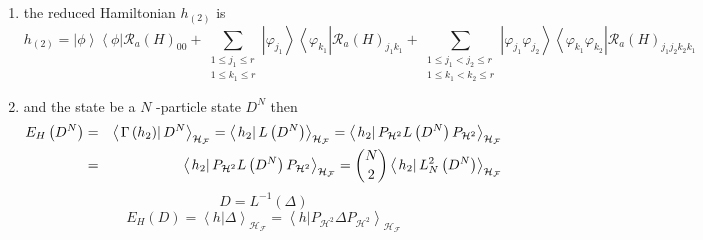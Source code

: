 \documentclass[aps,preprint]{revtex4}
\begin{document}
\begin{enumerate}
\item the reduced Hamiltonian $h_{\left( 2\right) }$ is 
\begin{equation}
h_{\left( 2\right) }=\left\vert \phi \right\rangle \left\langle \phi
\right\vert \mathcal{R}_{a}\left( H\right) _{00}+\sum_{\substack{ 1\leq
j_{1}\leq r  \\ 1\leq k_{1}\leq r}}\left\vert \varphi _{j_{1}}\right\rangle
\left\langle \varphi _{k_{1}}\right\vert \mathcal{R}_{a}\left( H\right)
_{j_{1}k_{1}}+\sum_{\substack{ 1\leq j_{1}<j_{2}\leq r  \\ 1\leq
k_{1}<k_{2}\leq r}}\left\vert \varphi _{j_{1}}\varphi _{j_{2}}\right\rangle
\left\langle \varphi _{k_{1}}\varphi _{k_{2}}\right\vert \mathcal{R}%
_{a}\left( H\right) _{j_{1}j_{2}k_{2}k_{1}}
\end{equation}

\item and the state be a $N$ -particle state $D^{N}$ then \label{09/10/2026} 
\begin{eqnarray}
E_{H}\left( D^{N}\right)  &=&\left\langle \left. \Gamma \left( h_{2}\right)
\right\vert D^{N}\right\rangle _{\mathcal{H}_{\mathcal{F}}}=\left\langle
\left. h_{2}\right\vert L\left( D^{N}\right) \right\rangle _{\mathcal{H}_{%
\mathcal{F}}}=\left\langle \left. h_{2}\right\vert P_{\mathcal{H}%
^{2}}L\left( D^{N}\right) P_{\mathcal{H}^{2}}\right\rangle _{\mathcal{H}_{%
\mathcal{F}}} \\
&=&\left\langle \left. h_{2}\right\vert P_{\mathcal{H}^{2}}L\left(
D^{N}\right) P_{\mathcal{H}^{2}}\right\rangle _{\mathcal{H}_{\mathcal{F}}}=%
\binom{N}{2}\left\langle \left. h_{2}\right\vert L_{N}^{2}\left(
D^{N}\right) \right\rangle _{\mathcal{H}_{\mathcal{F}}}
\end{eqnarray}%
\begin{equation}
D=L^{-1}\left( \Delta \right) 
\end{equation}%
\begin{equation}
E_{H}\left( D\right) =\left\langle \left. h\right\vert \Delta \right\rangle
_{\mathcal{H}_{\mathcal{F}}}=\left\langle \left. h\right\vert P_{\mathcal{H}%
^{2}}\Delta P_{\mathcal{H}^{2}}\right\rangle _{\mathcal{H}_{\mathcal{F}}}
\end{equation}


\end{enumerate}
\end{document}
